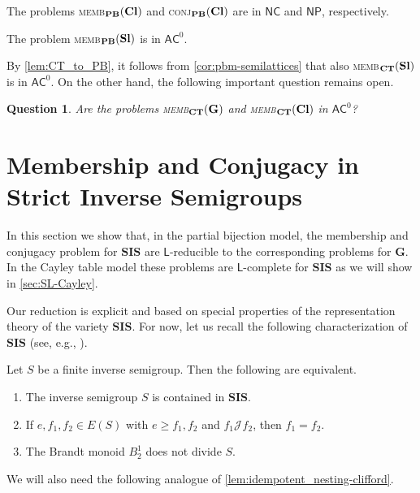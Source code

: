 \documentclass[anonymous,letter,UKenglish,cleveref,autoref,thm-restate]{lipics-v2021}
\renewcommand{\geq}{\geqslant}
\newcommand{\ACz}{\ensuremath{\mathsf{AC}^0}\xspace}
\newcommand{\NC}{\ensuremath{\mathsf{NC}}\xspace}
\newcommand{\LOGSPACE}{\ensuremath{\mathsf{L}}\xspace}
\newcommand{\NP}{\ensuremath{\mathsf{NP}}\xspace}
\newcommand{\vG}{\ensuremath{\mathbf{G}}}
\newcommand{\vSl}{\ensuremath{\mathbf{Sl}}}
\newcommand{\vCl}{\ensuremath{\mathbf{Cl}}}
\newcommand{\vSI}{\ensuremath{\mathbf{SIS}}}
\newcommand*{\gJ}[1][]{\mathrel{\mathcal{J}_{#1}}}
\theoremstyle{plain}
\newtheorem{question}[theorem]{Question}
\theoremstyle{plain}
\newcommand{\dMemb}[2][]{\textup{\textsc{memb${}_{\mathbf{#1}}\expandafter\ifx\expandafter\relax\detokenize{#2}\relax\else(#2)\fi$}}}
\newcommand{\dConj}[2][]{\textup{\textsc{conj${}_{\mathbf{#1}}\expandafter\ifx\expandafter\relax\detokenize{#2}\relax\else(#2)\fi$}}}
\begin{document}
\begin{corollary}\label{cor:pbm-clifford-groups}
  The problems \dMemb[PB]{\vCl} and \dConj[PB]{\vCl} are in \NC and \NP, respectively.
\end{corollary}
\begin{corollary}\label{cor:pbm-semilattices}
  The problem \dMemb[PB]{\vSl} is in \ACz.
\end{corollary}

By \cref{lem:CT_to_PB}, it follows from \cref{cor:pbm-semilattices} that also \dMemb[CT]{\vSl} is in \ACz. On the other hand, the following important question remains open.

\begin{question}
  Are the problems \dMemb[CT]{\vG} and  \dMemb[CT]{\vCl} in \ACz?
\end{question}


\section{Membership and Conjugacy in Strict Inverse Semigroups}

In this section we show that, in the partial bijection model, the membership and conjugacy problem for $\vSI$ are \LOGSPACE-reducible to the corresponding problems for $\vG$.
In the Cayley table model these problems are \LOGSPACE-complete for $\vSI$ as we will show in \cref{sec:SL-Cayley}.

Our reduction is explicit and based on special properties of the representation theory of the variety $\vSI$.
For now, let us recall the following characterization of $\vSI$ (see, e.g., \cite{HallJohnston89}).

\begin{lemma}\label{lem:gb-characterization}
  Let $S$ be a finite inverse semigroup.
  Then the following are equivalent.
  \begin{enumerate}
    \item The inverse semigroup $S$ is contained in $\vSI$.
    \item If $e,f_1,f_2 \in E(S)$ with $e \geq f_1, f_2$ and $f_1 \gJ f_2$, then $f_1 = f_2$.
    \item The Brandt monoid $B^1_2$ does not divide $S$.
  \end{enumerate}
\end{lemma}

We will also need the following analogue of \cref{lem:idempotent_nesting-clifford}.
\end{document}
